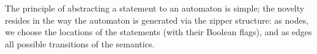 \begin{isabellebody}
\begin{isamarkuptext}
\begin{center}
\end{center}\end{isamarkuptext}\isamarkuptrue {}
\isamarkuptrue \begin{isamarkuptext}The principle of abstracting a statement to an automaton is simple;
the novelty resides in the way the automaton is generated via the zipper
structure: as nodes, we choose the locations of the statements (with their
Boolean flags), and as edges all possible transitions of the semantics.


\end{isamarkuptext}
\end{isabellebody}
